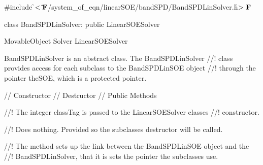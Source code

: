 
\indent \#include \f$<\tilde{ }{\bf F}$/system\_of\_eqn/linearSOE/bandSPD/BandSPDLinSolver.h\f$>{\bf F}$

\indent class BandSPDLinSolver: public LinearSOESolver

\indent MovableObject
\indent\indent  Solver
\indent\indent\indent LinearSOESolver
\indent\indent\indent{}

\indent BandSPDLinSolver is an abstract class. The BandSPDLinSolver
//! class provides access for each subclass to the BandSPDLinSOE object
//! through the pointer \p theSOE, which is a protected pointer.

\indent\indent // Constructor
\indent{}
\indent\indent // Destructor
\indent{}
\indent\indent // Public Methods
\indent{}

//! The integer \p classTag is passed to the LinearSOESolver classes
//! constructor. 

//! Does nothing. Provided so the subclasses destructor will be called.

//! The method sets up the link between the BandSPDLinSOE object and the
//! BandSPDLinSolver, that it is sets the pointer the subclasses use.





